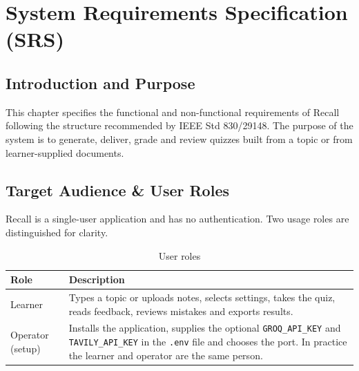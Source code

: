 \chapter{System Requirements Specification (SRS)}

\section{Introduction and Purpose}
This chapter specifies the functional and non-functional requirements of Recall following the structure recommended by IEEE Std 830/29148. The purpose of the system is to generate, deliver, grade and review quizzes built from a topic or from learner-supplied documents.

\section{Target Audience \& User Roles}
Recall is a single-user application and has no authentication. Two usage roles are distinguished for clarity.
\begin{table}[H]
\centering
\begin{tabularx}{\textwidth}{@{} p{3cm} X @{}}
\toprule
\textbf{Role} & \textbf{Description} \\
\midrule
Learner & Types a topic or uploads notes, selects settings, takes the quiz, reads feedback, reviews mistakes and exports results. \\
Operator (setup) & Installs the application, supplies the optional \texttt{GROQ\_API\_KEY} and \texttt{TAVILY\_API\_KEY} in the \texttt{.env} file and chooses the port. In practice the learner and operator are the same person. \\
\bottomrule
\end{tabularx}
\caption{User roles}
\label{tab:roles}
\end{table}

